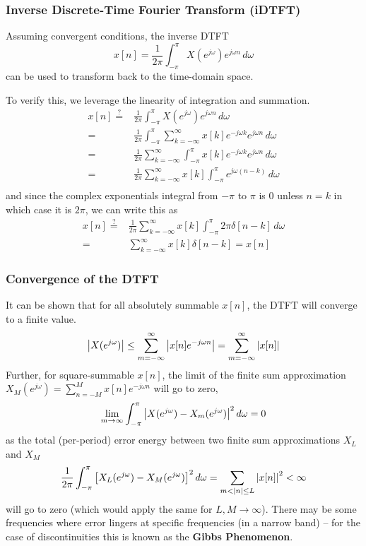 \documentclass{article}
\newcommand{\jw}{{j\omega}}
\newcommand{\w}{\omega}
\newcommand{\sumkinfty}{\sum_{k=-\infty}^\infty}
\begin{document}
\subsubsection{Inverse Discrete-Time Fourier Transform (iDTFT)}
Assuming convergent conditions, the inverse DTFT \[
    x[n] = \frac{1}{2\pi} \int_{-\pi}^\pi X(e^{j\omega})e^{j\omega n}\,d\omega
\]
can be used to transform back to the time-domain space.

To verify this, we leverage the linearity of integration and summation.
\begin{align*}
	x[n] \stackrel{?}{=}&\frac{1}{2\pi} \int_{-\pi}^\pi X(e^{j\omega})e^{j\omega n}\,d\omega\\
		                  =& \frac{1}{2\pi} \int_{-\pi}^\pi \sumkinfty x[k]e^{-\jw k} e^{j\omega n}\,d\omega\\
		                  =& \frac{1}{2\pi} \sumkinfty \int_{-\pi}^\pi x[k]e^{-\jw k} e^{j\omega n}\,d\omega\\
		                  =& \frac{1}{2\pi} \sumkinfty x[k]\int_{-\pi}^\pi e^{j\omega (n-k)}\,d\omega\\
\end{align*}
and since the complex exponentials integral from $-\pi$ to $\pi$ is $0$ unless $n=k$ in which case it is $2\pi$, we can write this as
\begin{align*}
	x[n] \stackrel{?}{=}& \frac{1}{2\pi} \sumkinfty x[k] \int_{-\pi}^\pi 2\pi\delta[n-k]\,d\omega\\
	    =& \sumkinfty x[k]\delta[n-k] = x[n]
\end{align*}

\subsubsection{Convergence of the DTFT}
It can be shown that for all absolutely summable $x[n]$, the DTFT will converge to a finite value.
\[
\qty|X(e^\jw)|\le\sum_{m=-\infty}^\infty \qty|x[n]e^{-\jw n}| =\sum_{m=-\infty}^\infty \qty|x[n]|
\]
Further, for square-summable $x[n]$, the limit of the finite sum approximation $X_M(e^\jw)=\sum_{n=-M}^Mx[n]e^{-\jw n}$ will go to zero,
\begin{align*}
	\lim_{m\to\infty} \int_{-\pi}^\pi \qty|X(e^\jw) - X_m(e^\jw)|^2\,d\w = 0
\end{align*}
as the total (per-period) error energy between two finite sum approximations $X_L$ and $X_M$
\[
    \frac{1}{2\pi}\int_{-\pi}^\pi \qty[X_L(e^\jw) -X_M(e^\jw)]^2\,d\omega = \sum_{m<|n|\le L} \qty|x[n]|^2<\infty
\]
will go to zero (which would apply the same for $L,M\to\infty$). There may be some frequencies where error lingers at specific frequencies (in a narrow band) -- for the case of discontinuities this is known as the \textbf{Gibbs Phenomenon}.
\end{document}
